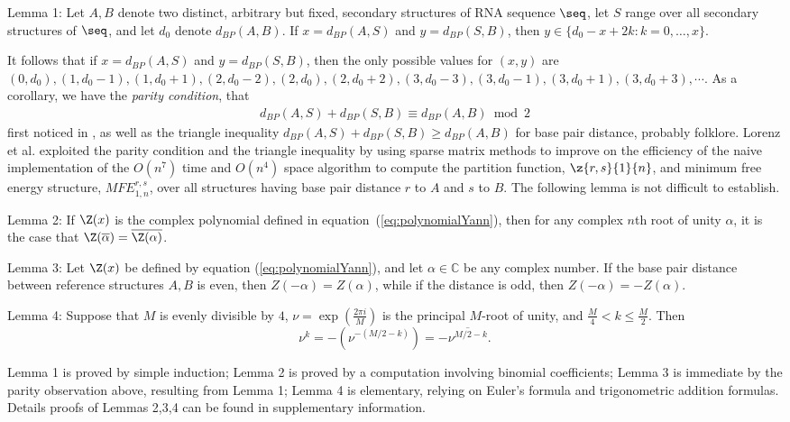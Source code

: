 \noindent
{\sc Lemma 1:} Let $A,B$ denote two distinct, arbitrary but fixed,
 secondary structures of RNA sequence $\seq$, let $S$ range over
all secondary structures of $\seq$, and let $d_0$ denote $d_{BP}(A,B)$.
If $x=d_{BP}(A,S)$ and $y=d_{BP}(S,B)$, then
$y \in \{ d_0-x+2k: k=0,\ldots,x\}$.
\medskip

\noindent
It follows that if $x=d_{BP}(A,S)$ and $y=d_{BP}(S,B)$,
then the only possible values for
$(x,y)$ are $(0,d_0), (1,d_0-1), (1,d_0+1),
(2,d_0-2), (2,d_0), (2, d_0+2),
(3,d_0-3), (3,d_0-1), (3, d_0+1), (3,d_0+3), \cdots$.
As a corollary, we have the {\em parity condition}, that
\begin{eqnarray}
\label{eq:parity}
d_{BP}(A,S)+d_{BP}(S,B) \equiv d_{BP}(A,B) \bmod 2
\end{eqnarray}
first noticed in \cite{hofacker:RNAbor2D}, as well as
the triangle inequality
$d_{BP}(A,S)+d_{BP}(S,B) \geq d_{BP}(A,B)$
for base pair distance, probably folklore.
Lorenz et al. \cite{hofacker:RNAbor2D} exploited the parity condition
and the triangle inequality by using sparse matrix methods to improve on
the efficiency of the naive  implementation of the
$O(n^7)$ time and $O(n^4)$ space algorithm to compute
the partition function, $\z{r,s}{1}{n}$,
and minimum free energy structure, $MFE^{r,s}_{1,n}$, over all
structures having base pair distance $r$ to $A$ and $s$ to $B$.
The following lemma is not difficult to establish.
\medskip

\noindent
{\sc Lemma 2:} If $\Z(x)$ is the complex polynomial defined in
equation~(\ref{eq:polynomialYann}), then for any complex $n$th root of
unity $\alpha$, it is the case that $\Z(\overline{\alpha}) =
\overline{\Z(\alpha)}$.
\medskip

\noindent
{\sc Lemma 3:}
Let $\Z(x)$ be defined by equation (\ref{eq:polynomialYann}), and
let $\alpha \in \mathbb{C}$ be any complex number.
If the base pair distance between reference
structures $A,B$ is even, then $Z(-\alpha)=Z(\alpha)$, while if
the distance is odd, then $Z(-\alpha)=-Z(\alpha)$.
\medskip

\noindent
{\sc Lemma 4:} Suppose that $M$ is evenly divisible by $4$,
$\nu = \exp(\frac{2 \pi i}{M})$ is the principal $M$-root of unity, and
$\frac{M}{4} < k \leq \frac{M}{2}$. Then
\[
\nu^k = -(\nu^{-(M/2-k)}) = - \overline{\nu^{M/2-k}}.
\]
\medskip

Lemma 1 is proved by simple induction; Lemma 2
is proved by a computation involving binomial coefficients;
Lemma 3 is immediate
by the parity observation above, resulting from Lemma 1;
Lemma 4 is elementary, relying on Euler's
formula and trigonometric addition formulas. Details proofs of
Lemmas 2,3,4 can be found in supplementary information.

